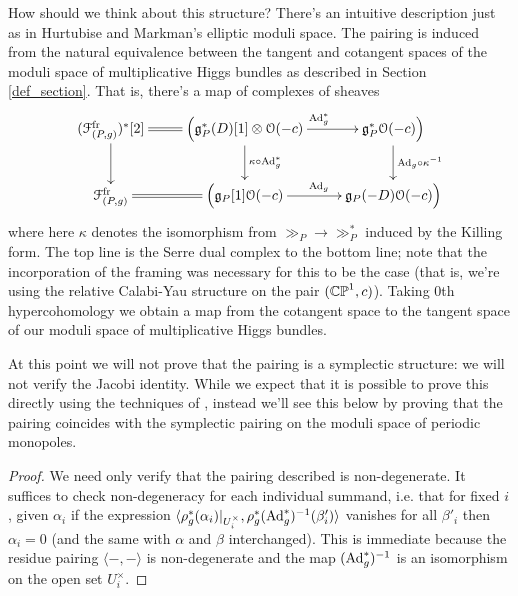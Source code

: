 \documentclass[10pt, oneside]{article}
\newcommand{\fr}{\mathrm{fr}}
\newcommand{\Ad}{\mr{Ad}}
\begin{document}
\begin{remark}
How should we think about this structure?  There's an intuitive description just as in Hurtubise and Markman's elliptic moduli space.  The pairing is induced from the natural equivalence between the tangent and cotangent spaces of the moduli space of multiplicative Higgs bundles as described in Section \ref{def_section}.  That is, there's a map of complexes of sheaves
\[\xymatrix{
(\mc F^\fr_{(P,g)})^*[2] \ar@{=}[r] \ar[d] &\Big(\gg^*_P(D)[1] \otimes \OO(-c) \ar[d]^{\kappa \circ \Ad_g^*} \ar[r]^{\Ad_g^*} &\gg^*_P \OO(-c)\Big)\ar[d]^{\Ad_g \circ \kappa^{-1}} \\
\mc F^\fr_{(P,g)} \ar@{=}[r] &\Big(\gg_P[1] \OO(-c) \ar[r]^{\Ad_g} &\gg_P(-D) \OO(-c)\Big)
}\]
where here $\kappa$ denotes the isomorphism from $\gg_P \to \gg^*_P$ induced by the Killing form.  The top line is the Serre dual complex to the bottom line; note that the incorporation of the framing was necessary for this to be the case (that is, we're using the relative Calabi-Yau structure on the pair $(\mathbb{CP}^1, c)$).  Taking 0th hypercohomology we obtain a map from the cotangent space to the tangent space of our moduli space of multiplicative Higgs bundles.
\end{remark}

\begin{remark}
At this point we will not prove that the pairing is a symplectic structure: we will not verify the Jacobi identity.  While we expect that it is possible to prove this directly using the techniques of \cite[Section 5]{HurtubiseMarkman}, instead we'll see this below by proving that the pairing coincides with the symplectic pairing on the moduli space of periodic monopoles.
\end{remark}

\begin{proof}
We need only verify that the pairing described is non-degenerate.  It suffices to check non-degeneracy for each individual summand, i.e. that for fixed $i$, given $\alpha_i$ if the expression $\langle \rho_g^*(\alpha_i)|_{U^\times_i}, \rho_g^*(\Ad_g^*)^{-1}(\beta'_i) \rangle$ vanishes for all $\beta'_i$ then $\alpha_i=0$ (and the same with $\alpha$ and $\beta$ interchanged).  This is immediate because the residue pairing $\langle - , - \rangle$ is non-degenerate and the map $(\Ad_g^*)^{-1}$ is an isomorphism on the open set $U^\times_i$.
\end{proof}
\end{document}
